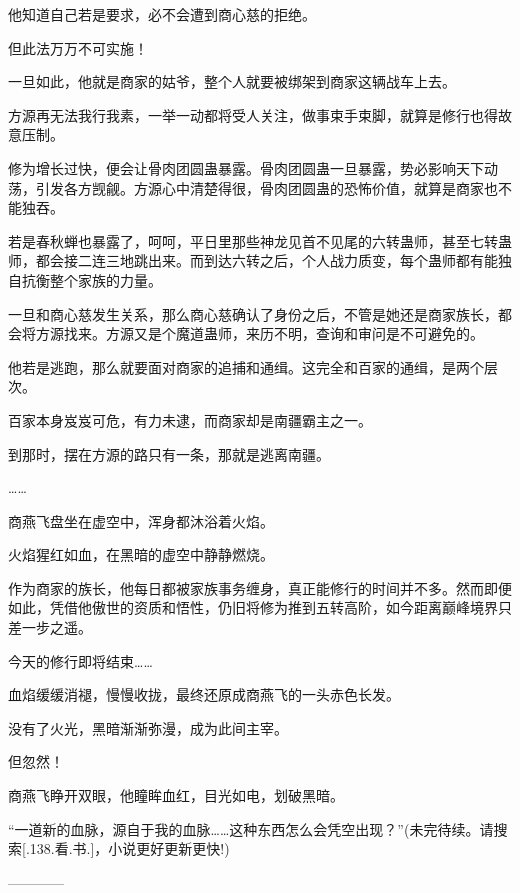 \begin{this_body}
他知道自己若是要求，必不会遭到商心慈的拒绝。

但此法万万不可实施！

一旦如此，他就是商家的姑爷，整个人就要被绑架到商家这辆战车上去。

方源再无法我行我素，一举一动都将受人关注，做事束手束脚，就算是修行也得故意压制。

修为增长过快，便会让骨肉团圆蛊暴露。骨肉团圆蛊一旦暴露，势必影响天下动荡，引发各方觊觎。方源心中清楚得很，骨肉团圆蛊的恐怖价值，就算是商家也不能独吞。

若是春秋蝉也暴露了，呵呵，平日里那些神龙见首不见尾的六转蛊师，甚至七转蛊师，都会接二连三地跳出来。而到达六转之后，个人战力质变，每个蛊师都有能独自抗衡整个家族的力量。

一旦和商心慈发生关系，那么商心慈确认了身份之后，不管是她还是商家族长，都会将方源找来。方源又是个魔道蛊师，来历不明，查询和审问是不可避免的。

他若是逃跑，那么就要面对商家的追捕和通缉。这完全和百家的通缉，是两个层次。

百家本身岌岌可危，有力未逮，而商家却是南疆霸主之一。

到那时，摆在方源的路只有一条，那就是逃离南疆。

……

商燕飞盘坐在虚空中，浑身都沐浴着火焰。

火焰猩红如血，在黑暗的虚空中静静燃烧。

作为商家的族长，他每日都被家族事务缠身，真正能修行的时间并不多。然而即便如此，凭借他傲世的资质和悟性，仍旧将修为推到五转高阶，如今距离巅峰境界只差一步之遥。

今天的修行即将结束……

血焰缓缓消褪，慢慢收拢，最终还原成商燕飞的一头赤色长发。

没有了火光，黑暗渐渐弥漫，成为此间主宰。

但忽然！

商燕飞睁开双眼，他瞳眸血红，目光如电，划破黑暗。

“一道新的血脉，源自于我的血脉……这种东西怎么会凭空出现？”(未完待续。请搜索[.138.看.书.]，小说更好更新更快!)

------------

\end{this_body}

